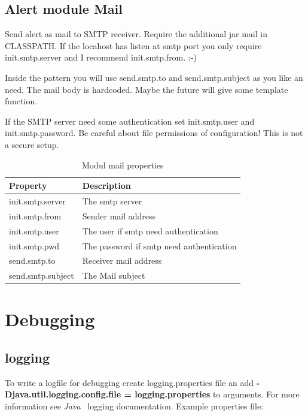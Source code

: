 \documentclass[11pt,a4paper]{article}
\newcommand{\java}{\textit{Java\ }}
\begin{document}
\subsection{Alert module Mail}

Send alert as mail to SMTP receiver. Require the additional jar mail in
CLASSPATH. If the locahost has listen at smtp port you only require 
init.smtp.server and I recommend init.smtp.from. :-) 

Inside the pattern you will use send.smtp.to and send.smtp.subject as you like
an need. The mail body is hardcoded. Maybe the future will give
some template function. 

If the SMTP server need some authentication set init.smtp.user and
init.smtp.password. Be careful about file permissions of
configuration! This is not a secure setup.

\begin{table}[ht]
\begin{tabular}{l|p{}}
  Property 		    & Description\\\hline
  init.smtp.server 	& The smtp server\\
  init.smtp.from    & Sender mail address\\
  init.smtp.user 	& The user if smtp need authentication\\
  init.smtp.pwd 	& The password if smtp need authentication\\
  send.smtp.to 		& Receiver mail address\\
  send.smtp.subject & The Mail subject\\
\end{tabular}
\caption{Modul mail properties}
\end{table}

\section{Debugging}

\subsection{logging}

To write a logfile for debugging create logging.properties file an add
\textbf{-Djava.util.logging.config.file = logging.properties} to arguments.
For more information see \java
logging documentation. Example properties file:
\end{document}
